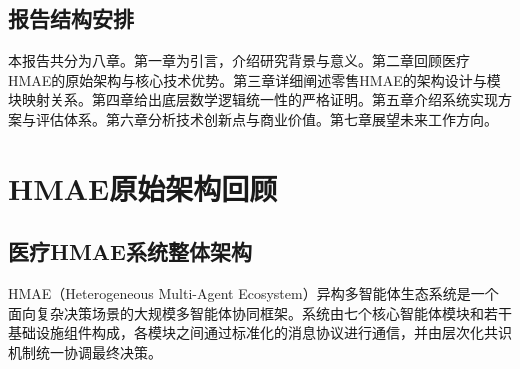 \documentclass[11pt,a4paper]{ctexart}
\theoremstyle{remark}
\begin{document}
\subsection{报告结构安排}

本报告共分为八章。第一章为引言，介绍研究背景与意义。第二章回顾医疗HMAE的原始架构与核心技术优势。第三章详细阐述零售HMAE的架构设计与模块映射关系。第四章给出底层数学逻辑统一性的严格证明。第五章介绍系统实现方案与评估体系。第六章分析技术创新点与商业价值。第七章展望未来工作方向。

\newpage

\section{HMAE原始架构回顾}

\subsection{医疗HMAE系统整体架构}

HMAE（Heterogeneous Multi-Agent Ecosystem）异构多智能体生态系统是一个面向复杂决策场景的大规模多智能体协同框架。系统由七个核心智能体模块和若干基础设施组件构成，各模块之间通过标准化的消息协议进行通信，并由层次化共识机制统一协调最终决策。
\end{document}
